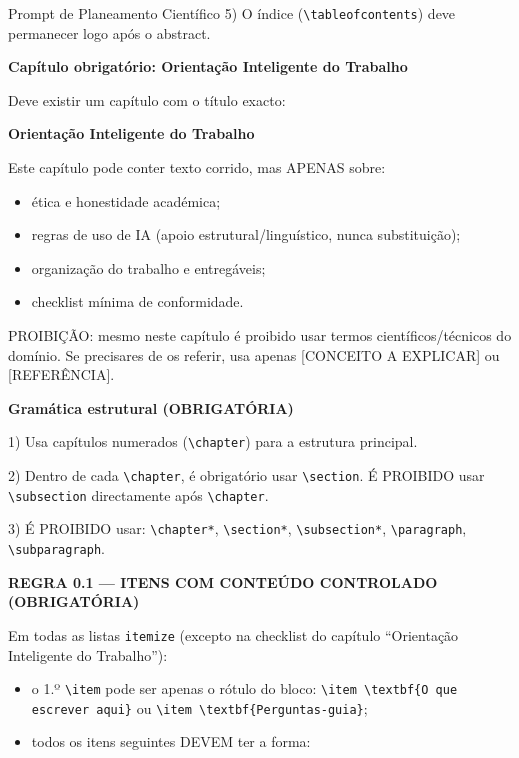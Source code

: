 \documentclass[12pt,a4paper,twoside]{report}
\begin{document}
\begin{promptcientifico}{Prompt de Planeamento Científico}
5) O índice (\texttt{\textbackslash tableofcontents}) deve permanecer logo após o abstract.

\textbf{Capítulo obrigatório: Orientação Inteligente do Trabalho}

Deve existir um capítulo com o título exacto:
\begin{center}
\textbf{Orientação Inteligente do Trabalho}
\end{center}

Este capítulo pode conter texto corrido, mas APENAS sobre:
\begin{itemize}
\item ética e honestidade académica;
\item regras de uso de IA (apoio estrutural/linguístico, nunca substituição);
\item organização do trabalho e entregáveis;
\item checklist mínima de conformidade.
\end{itemize}

PROIBIÇÃO: mesmo neste capítulo é proibido usar termos científicos/técnicos do domínio.
Se precisares de os referir, usa apenas [CONCEITO A EXPLICAR] ou [REFERÊNCIA].

\textbf{Gramática estrutural (OBRIGATÓRIA)}

1) Usa capítulos numerados (\texttt{\textbackslash chapter}) para a estrutura principal.

2) Dentro de cada \texttt{\textbackslash chapter}, é obrigatório usar \texttt{\textbackslash section}.
É PROIBIDO usar \texttt{\textbackslash subsection} directamente após \texttt{\textbackslash chapter}.

3) É PROIBIDO usar: \texttt{\textbackslash chapter*}, \texttt{\textbackslash section*},
\texttt{\textbackslash subsection*}, \texttt{\textbackslash paragraph}, \texttt{\textbackslash subparagraph}.

\textbf{REGRA 0.1 — ITENS COM CONTEÚDO CONTROLADO (OBRIGATÓRIA)}

Em todas as listas \texttt{itemize} (excepto na checklist do capítulo “Orientação Inteligente do Trabalho”):

\begin{itemize}
\item o 1.º \texttt{\textbackslash item} pode ser apenas o rótulo do bloco:
      \texttt{\textbackslash item \textbackslash textbf\{O que escrever aqui\}}
      ou
      \texttt{\textbackslash item \textbackslash textbf\{Perguntas-guia\}};
\item todos os itens seguintes DEVEM ter a forma:
\end{itemize}


\end{promptcientifico}
\end{document}
